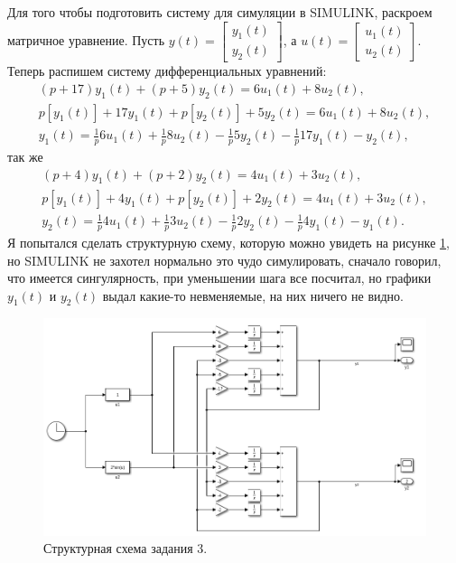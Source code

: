 Для того чтобы подготовить систему для симуляции в SIMULINK, раскроем матричное уравнение.
Пусть $y(t)=\begin{bmatrix}y_1(t)\\y_2(t)\end{bmatrix}$, 
а $u(t)=\begin{bmatrix}u_1(t)\\u_2(t)\end{bmatrix}$.
Теперь распишем систему дифференциальных уравнений:
\begin{equation*}
    \begin{array}{c}
        (p+17)y_1(t)+(p+5)y_2(t)=6u_1(t)+8u_2(t),\\[2mm]
        p[y_1(t)]+17y_1(t)+p[y_2(t)]+5y_2(t)=6u_1(t)+8u_2(t),\\[2mm]
        y_1(t)=\frac{1}{p}6u_1(t)+\frac{1}{p}8u_2(t)-\frac{1}{p}5y_2(t)-\frac{1}{p}17y_1(t)-y_2(t),
    \end{array}
\end{equation*}
так же
\begin{equation*}
    \begin{array}{c}
        (p+4)y_1(t)+(p+2)y_2(t)=4u_1(t)+3u_2(t),\\[2mm]
        p[y_1(t)]+4y_1(t)+p[y_2(t)]+2y_2(t)=4u_1(t)+3u_2(t),\\[2mm]
        y_2(t)=\frac{1}{p}4u_1(t)+\frac{1}{p}3u_2(t)-\frac{1}{p}2y_2(t)-\frac{1}{p}4y_1(t)-y_1(t).
    \end{array}
\end{equation*}
Я попытался сделать структурную схему, которую можно увидеть на рисунке 
\ref{fig:task3_slx}, но SIMULINK не захотел нормально это чудо симулировать,
сначало говорил, что имеется сингулярность, при уменьшении шага все посчитал, но
графики $y_1(t)$ и $y_2(t)$ выдал какие-то невменяемые, на них ничего не видно.
\begin{figure}[htbp]
    \centering
    \includegraphics[width=1\linewidth]{figs/task_3_slx.png}
    \caption{Структурная схема задания 3.}
    \label{fig:task3_slx}
\end{figure}




